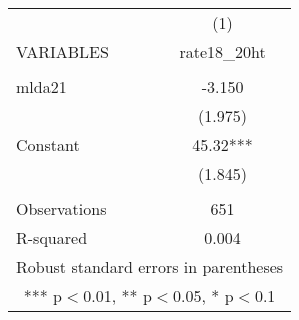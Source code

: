 \begin{tabular}{lc} \hline
 & (1) \\
VARIABLES & rate18\_20ht \\ \hline
 &  \\
mlda21 & -3.150 \\
 & (1.975) \\
Constant & 45.32*** \\
 & (1.845) \\
 &  \\
Observations & 651 \\
 R-squared & 0.004 \\ \hline
\multicolumn{2}{c}{ Robust standard errors in parentheses} \\
\multicolumn{2}{c}{ *** p$<$0.01, ** p$<$0.05, * p$<$0.1} \\
\end{tabular}

